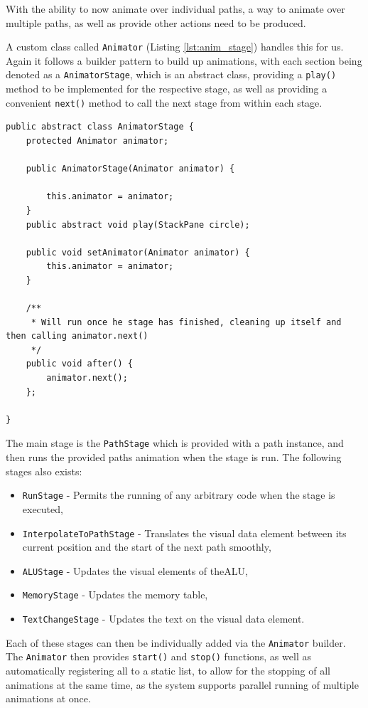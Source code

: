 With the ability to now animate over individual paths, a way to animate over multiple paths, as well as provide other actions need to be produced.

A custom class called \texttt{Animator} (Listing \ref{lst:anim_stage}) handles this for us. Again it follows a builder pattern to build up animations, with each section being denoted as a \texttt{AnimatorStage}, which is an abstract class, providing a \verb|play()| method to be implemented for the respective stage, as well as providing a convenient \verb|next()| method to call the next stage from within each stage.

\begin{lstlisting}[caption=Abstract \texttt{AnimatorStage} class, label=lst:anim_stage]
public abstract class AnimatorStage {
    protected Animator animator;

    public AnimatorStage(Animator animator) {

        this.animator = animator;
    }
    public abstract void play(StackPane circle);

    public void setAnimator(Animator animator) {
        this.animator = animator;
    }

    /**
     * Will run once he stage has finished, cleaning up itself and then calling animator.next()
     */
    public void after() {
        animator.next();
    };

}
\end{lstlisting}

The main stage is the \texttt{PathStage} which is provided with a path instance, and then runs the provided paths animation when the stage is run. The following stages also exists:

\begin{itemize}
    \item \texttt{RunStage} - Permits the running of any arbitrary code when the stage is executed,
    \item \texttt{InterpolateToPathStage} - Translates the visual data element between its current position and the start of the next path smoothly,
    \item \texttt{ALUStage} - Updates the visual elements of the\ac{ALU},
    \item \texttt{MemoryStage} - Updates the memory table,
    \item \texttt{TextChangeStage} - Updates the text on the visual data element.
\end{itemize}

Each of these stages can then be individually added via the \texttt{Animator} builder. The \texttt{Animator} then provides \verb|start()| and \verb|stop()| functions, as well as automatically registering all to a static list, to allow for the stopping of all animations at the same time, as the system supports parallel running of multiple animations at once.

